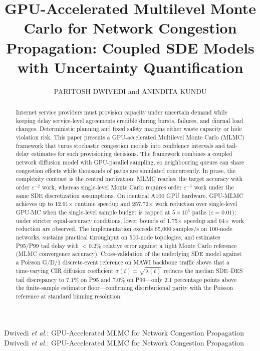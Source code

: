 \documentclass{ieeeaccess}
\begin{document}

\title{GPU-Accelerated Multilevel Monte Carlo for Network Congestion Propagation: Coupled SDE Models with Uncertainty Quantification}

\author{\uppercase{Paritosh Dwivedi} and
        \uppercase{Anindita Kundu}}
\address[1]{Vellore Institute of Technology, Vellore, India
(e-mail: \url{paritosh.dwivedi2024@vitstudent.ac.in})}
\address[2]{Vellore Institute of Technology, Vellore, India
(e-mail: anindita.kundu@vit.ac.in)}
\markboth
{Dwivedi \emph{et al.}: GPU-Accelerated MLMC for Network Congestion Propagation}
{Dwivedi \emph{et al.}: GPU-Accelerated MLMC for Network Congestion Propagation}

\begin{abstract}
Internet service providers must provision capacity under uncertain demand while keeping delay
service-level agreements credible during bursts, failures, and diurnal load changes. Deterministic
planning and fixed safety margins either waste capacity or hide violation risk. This paper presents
a GPU-accelerated Multilevel Monte Carlo (MLMC) framework that turns stochastic congestion
models into confidence intervals and tail-delay estimates for such provisioning decisions. The framework combines a coupled network diffusion model with GPU-parallel sampling, so
neighbouring queues can share congestion effects while thousands of paths are simulated
concurrently. In prose, the complexity contrast is the central motivation: MLMC reaches the
target accuracy with order $\varepsilon^{-2}$ work, whereas single-level Monte Carlo requires
order $\varepsilon^{-3}$ work under the same SDE discretization assumptions. On identical A100 GPU hardware, GPU‑MLMC achieves up to 12.91× runtime speedup and 257.72× work reduction over single‑level GPU‑MC when the single‑level sample budget is capped at $5\times10^5$ paths ($\varepsilon = 0.01$); under stricter equal‑accuracy conditions, lower bounds of 1.75× speedup and 64× work reduction are observed. The implementation
exceeds 65,000 samples/s on 100-node networks, sustains practical throughput on 500-node
topologies, and estimates P95/P99 tail delay with $<0.2\%$ relative error against a tight
Monte Carlo reference (MLMC convergence accuracy). Cross-validation of the underlying SDE
model against a Poisson G/D/1 discrete-event reference on MAWI backbone traffic shows that
a time-varying CIR diffusion coefficient $\sigma(t){=}\sqrt{\lambda(t)}$ reduces the median
SDE--DES tail discrepancy to $7.1\%$ on P95 and $7.0\%$ on P99---only $2.1$ percentage points
above the finite-sample estimator floor---confirming distributional parity with the Poisson
reference at standard binning resolution.
\end{abstract}
\end{document}
